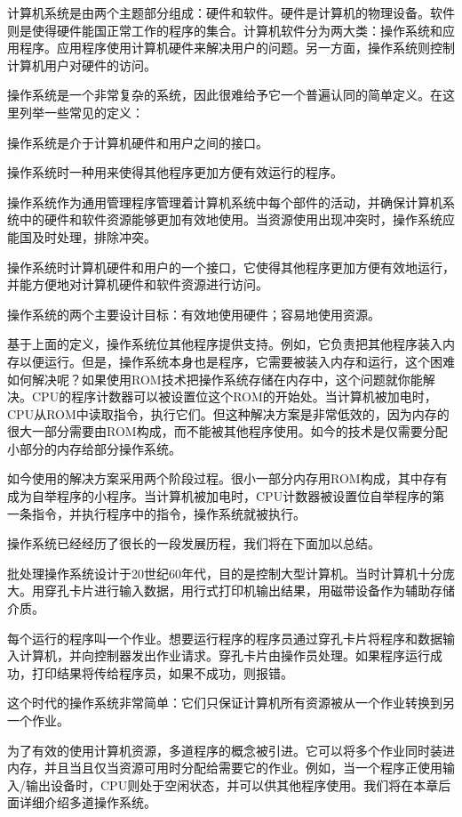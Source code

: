 
计算机系统是由两个主题部分组成：硬件和软件。硬件是计算机的物理设备。软件则是使得硬件能国正常工作的程序的集合。计算机软件分为两大类：操作系统和应用程序。应用程序使用计算机硬件来解决用户的问题。另一方面，操作系统则控制计算机用户对硬件的访问。

操作系统是一个非常复杂的系统，因此很难给予它一个普遍认同的简单定义。在这里列举一些常见的定义：

操作系统是介于计算机硬件和用户之间的接口。

操作系统时一种用来使得其他程序更加方便有效运行的程序。

操作系统作为通用管理程序管理着计算机系统中每个部件的活动，并确保计算机系统中的硬件和软件资源能够更加有效地使用。当资源使用出现冲突时，操作系统应能国及时处理，排除冲突。

操作系统时计算机硬件和用户的一个接口，它使得其他程序更加方便有效地运行，并能方便地对计算机硬件和软件资源进行访问。

操作系统的两个主要设计目标：有效地使用硬件；容易地使用资源。

基于上面的定义，操作系统位其他程序提供支持。例如，它负责把其他程序装入内存以便运行。但是，操作系统本身也是程序，它需要被装入内存和运行，这个困难如何解决呢？如果使用ROM技术把操作系统存储在内存中，这个问题就你能解决。CPU的程序计数器可以被设置位这个ROM的开始处。当计算机被加电时，CPU从ROM中读取指令，执行它们。但这种解决方案是非常低效的，因为内存的很大一部分需要由ROM构成，而不能被其他程序使用。如今的技术是仅需要分配小部分的内存给部分操作系统。

如今使用的解决方案采用两个阶段过程。很小一部分内存用ROM构成，其中存有成为自举程序的小程序。当计算机被加电时，CPU计数器被设置位自举程序的第一条指令，并执行程序中的指令，操作系统就被执行。

操作系统已经经历了很长的一段发展历程，我们将在下面加以总结。

批处理操作系统设计于20世纪60年代，目的是控制大型计算机。当时计算机十分庞大。用穿孔卡片进行输入数据，用行式打印机输出结果，用磁带设备作为辅助存储介质。

每个运行的程序叫一个作业。想要运行程序的程序员通过穿孔卡片将程序和数据输入计算机，并向控制器发出作业请求。穿孔卡片由操作员处理。如果程序运行成功，打印结果将传给程序员，如果不成功，则报错。

这个时代的操作系统非常简单：它们只保证计算机所有资源被从一个作业转换到另一个作业。

为了有效的使用计算机资源，多道程序的概念被引进。它可以将多个作业同时装进内存，并且当且仅当资源可用时分配给需要它的作业。例如，当一个程序正使用输入/输出设备时，CPU则处于空闲状态，并可以供其他程序使用。我们将在本章后面详细介绍多道操作系统。

